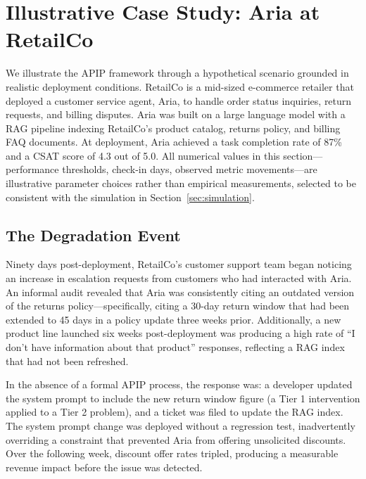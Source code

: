 \section{Illustrative Case Study: Aria at RetailCo}
\label{sec:case-study}

We illustrate the APIP framework through a hypothetical scenario grounded in
realistic deployment conditions. RetailCo is a mid-sized e-commerce retailer
that deployed a customer service agent, Aria, to handle order status inquiries,
return requests, and billing disputes. Aria was built on a large language model
with a RAG pipeline indexing RetailCo's product catalog, returns policy, and
billing FAQ documents. At deployment, Aria achieved a task completion rate of
87\% and a CSAT score of 4.3 out of 5.0. All numerical values in this
section---performance thresholds, check-in days, observed metric
movements---are illustrative parameter choices rather than empirical
measurements, selected to be consistent with the simulation in
Section~\ref{sec:simulation}.

\subsection{The Degradation Event}
\label{subsec:degradation-event}

Ninety days post-deployment, RetailCo's customer support team began noticing an
increase in escalation requests from customers who had interacted with Aria. An
informal audit revealed that Aria was consistently citing an outdated version
of the returns policy---specifically, citing a 30-day return window that had
been extended to 45 days in a policy update three weeks prior. Additionally, a
new product line launched six weeks post-deployment was producing a high rate
of ``I don't have information about that product'' responses, reflecting a RAG
index that had not been refreshed.

In the absence of a formal APIP process, the response was: a developer updated
the system prompt to include the new return window figure (a Tier 1
intervention applied to a Tier 2 problem), and a ticket was filed to update the
RAG index. The system prompt change was deployed without a regression test,
inadvertently overriding a constraint that prevented Aria from offering
unsolicited discounts. Over the following week, discount offer rates tripled,
producing a measurable revenue impact before the issue was detected.

